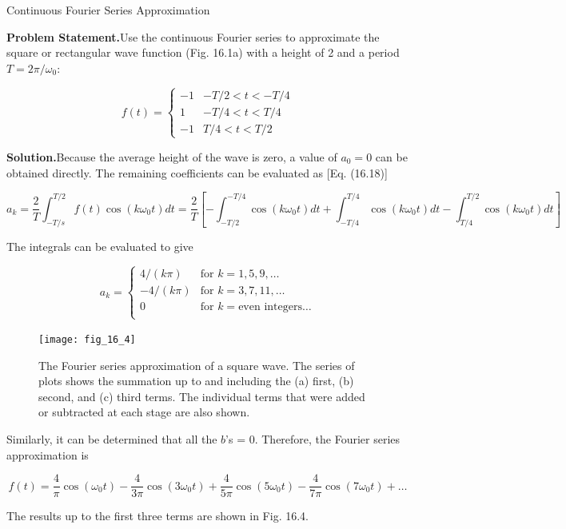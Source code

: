\documentclass[../main.tex]{subfiles}
\begin{document}
\begin{example} Continuous Fourier Series Approximation

    \noindent\textbf{Problem Statement.}\quad Use the continuous Fourier series to approximate the square or rectangular wave function (Fig. 16.1a) with a height of 2 and a period $T = 2\pi /\omega_0$:

	$$
		f(t) = \left\{ \begin{matrix}
			-1 & -T/2 < t < -T/4 \\
			1 & -T/4 < t < T/4 \\
			-1 & T/4 < t < T/2
		\end{matrix}  \right.
	$$

    \noindent\textbf{Solution.}\quad  Because the average height of the wave is zero, a value of $a_0 = 0$ can be
	obtained directly. The remaining coefficients can be evaluated as [Eq. (16.18)]

	$$
		a_k = \frac{2}{T} \int_{-T/s} ^{T/2} f(t) \cos (k \omega_0 t) dt = \frac{2}{T} [- \int ^ {-T/4} _ {-T/2} \cos(k \omega_0 t) dt + \int ^ {T/4} _ {-T/4} \cos (k \omega_0 t) dt - \int _ {T/4} ^ {T/2} \cos(k \omega_0 t) dt]
	$$

	\noindent The integrals can be evaluated to give

	$$
		a_k = \left\{ \begin{matrix}
			4 / (k \pi) & \text{for } k = 1,5,9, \dots \\
			-4 / (k \pi) & \text{for } k = 3,7,11, \dots \\
			0 & \text{for } k = \text{even integers} \dots \\
		\end{matrix} \right.
	$$

	\begin{figure}[H] 
		\centering
		\texttt{[image: fig\_16\_4]}
		\caption{\textsf{The Fourier series approximation of a square wave. The series of plots shows the summation up
		to and including the (a) first, (b) second, and (c) third terms. The individual terms that were
		added or subtracted at each stage are also shown.}}
		\label{fig:fig_16_4}
	\end{figure}

	\noindent Similarly, it can be determined that all the $b$'s = 0. Therefore, the Fourier series approximation is

	$$
		f(t) = \frac{4}{\pi} \cos(\omega_0 t) - \frac{4}{3 \pi} \cos(3 \omega_0 t) + \frac{4}{5 \pi} \cos(5 \omega_0 t) - \frac{4}{7 \pi} \cos (7 \omega_0 t) + \dots
	$$

	\noindent The results up to the first three terms are shown in Fig. 16.4.
\end{example}
\end{document}

